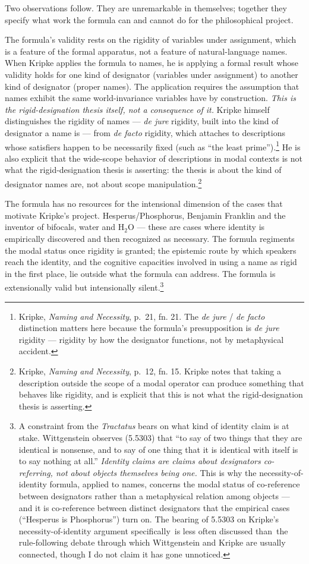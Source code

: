 \documentclass[12pt,a4paper]{article}
\begin{document}
Two observations follow. They are unremarkable in themselves; together they specify what work the formula can and cannot do for the philosophical project.

The formula's validity rests on the rigidity of variables under assignment, which is a feature of the formal apparatus, not a feature of natural-language names. When Kripke applies the formula to names, he is applying a formal result whose validity holds for one kind of designator (variables under assignment) to another kind of designator (proper names). The application requires the assumption that names exhibit the same world-invariance variables have by construction. \emph{This is the rigid-designation thesis itself, not a consequence of it.} Kripke himself distinguishes the rigidity of names --- \emph{de jure} rigidity, built into the kind of designator a name is --- from \emph{de facto} rigidity, which attaches to descriptions whose satisfiers happen to be necessarily fixed (such as ``the least prime'').\footnote{Kripke, \emph{Naming and Necessity}, p.~21, fn. 21. The \emph{de jure} / \emph{de facto} distinction matters here because the formula's presupposition is \emph{de jure} rigidity --- rigidity by how the designator functions, not by metaphysical accident.} He is also explicit that the wide-scope behavior of descriptions in modal contexts is not what the rigid-designation thesis is asserting: the thesis is about the kind of designator names are, not about scope manipulation.\footnote{Kripke, \emph{Naming and Necessity}, p.~12, fn. 15. Kripke notes that taking a description outside the scope of a modal operator can produce something that behaves like rigidity, and is explicit that this is not what the rigid-designation thesis is asserting.}

The formula has no resources for the intensional dimension of the cases that motivate Kripke's project. Hesperus/Phosphorus, Benjamin Franklin and the inventor of bifocals, water and H\(_2\)O --- these are cases where identity is empirically discovered and then recognized as necessary. The formula regiments the modal status once rigidity is granted; the epistemic route by which speakers reach the identity, and the cognitive capacities involved in using a name as rigid in the first place, lie outside what the formula can address. The formula is extensionally valid but intensionally silent.\footnote{A constraint from the \emph{Tractatus} bears on what kind of identity claim is at stake. Wittgenstein observes (5.5303) that ``to say of two things that they are identical is nonsense, and to say of one thing that it is identical with itself is to say nothing at all.'' \emph{Identity claims are claims about designators co-referring, not about objects themselves being one.} This is why the necessity-of-identity formula, applied to names, concerns the modal status of co-reference between designators rather than a metaphysical relation among objects --- and it is co-reference between distinct designators that the empirical cases (``Hesperus is Phosphorus'') turn on. The bearing of 5.5303 on Kripke's necessity-of-identity argument specifically~is less often discussed than~the rule-following debate through which Wittgenstein and Kripke are usually connected, though I do not claim it has gone unnoticed.}
\end{document}
